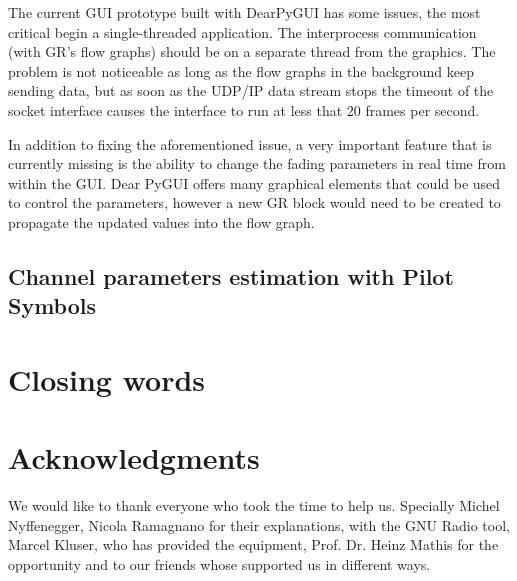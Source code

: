 The current GUI prototype built with DearPyGUI has some issues, the most critical begin a single-threaded application. The interprocess communication (with GR's flow graphs) should be on a separate thread from the graphics. The problem is not noticeable as long as the flow graphs in the background keep sending data, but as soon as the UDP/IP data stream stops the timeout of the socket interface causes the interface to run at less that 20 frames per second.

In addition to fixing the aforementioned issue, a very important feature that is currently missing is the ability to change the fading parameters in real time from within the GUI. Dear PyGUI offers many graphical elements that could be used to control the parameters, however a new GR block would need to be created to propagate the updated values into the flow graph.

\subsection{Channel parameters estimation with Pilot Symbols}



\section{Closing words}

\section{Acknowledgments}


We would like to thank everyone who took the time to help us. Specially Michel Nyffenegger, Nicola Ramagnano for their explanations, with the GNU Radio tool,
Marcel Kluser, who has provided the equipment, Prof. Dr. Heinz Mathis for the opportunity and to our friends whose supported us in different ways.



